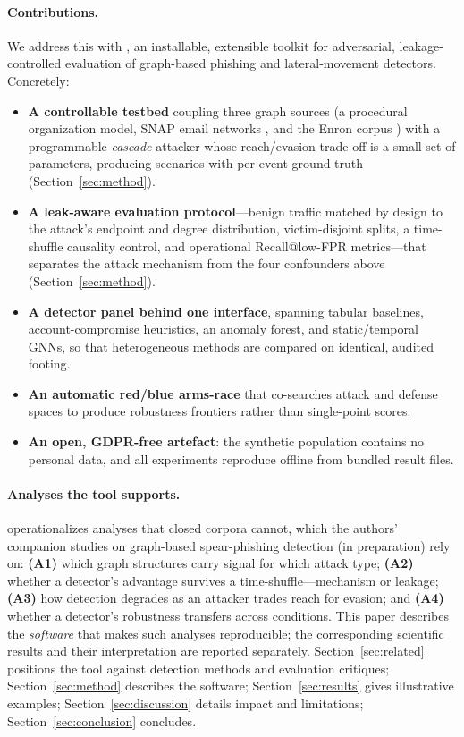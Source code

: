 \paragraph{Contributions.} We address this with \tool, an installable, extensible toolkit
for adversarial, leakage-controlled evaluation of graph-based phishing and lateral-movement
detectors. Concretely:

\begin{itemize}[leftmargin=1.4em,itemsep=2pt]
\item \textbf{A controllable testbed} coupling three graph sources (a procedural
  organization model, SNAP email networks \cite{leskovec2014snap}, and the Enron corpus
  \cite{klimt2004enron}) with a programmable \emph{cascade} attacker whose reach/evasion
  trade-off is a small set of parameters, producing scenarios with per-event ground truth
  (Section~\ref{sec:method}).
\item \textbf{A leak-aware evaluation protocol}---benign traffic matched by design to the
  attack's endpoint and degree distribution, victim-disjoint splits, a time-shuffle
  causality control, and operational Recall@low-FPR metrics---that separates the attack
  mechanism from the four confounders above (Section~\ref{sec:method}).
\item \textbf{A detector panel behind one interface}, spanning tabular baselines,
  account-compromise heuristics, an anomaly forest, and static/temporal GNNs, so that
  heterogeneous methods are compared on identical, audited footing.
\item \textbf{An automatic red/blue arms-race} that co-searches attack and defense spaces to
  produce robustness frontiers rather than single-point scores.
\item \textbf{An open, GDPR-free artefact}: the synthetic population contains no personal
  data, and all experiments reproduce offline from bundled result files.
\end{itemize}

\paragraph{Analyses the tool supports.} \tool operationalizes analyses that closed corpora
cannot, which the authors' companion studies on graph-based spear-phishing detection (in
preparation) rely on: \textbf{(A1)} which graph structures carry signal for which attack type;
\textbf{(A2)} whether a detector's advantage survives a time-shuffle---mechanism or leakage;
\textbf{(A3)} how detection degrades as an attacker trades reach for evasion; and
\textbf{(A4)} whether a detector's robustness transfers across conditions. This paper describes
the \emph{software} that makes such analyses reproducible; the corresponding scientific results
and their interpretation are reported separately. Section~\ref{sec:related} positions the tool
against detection methods and evaluation critiques; Section~\ref{sec:method} describes the
software; Section~\ref{sec:results} gives illustrative examples;
Section~\ref{sec:discussion} details impact and limitations;
Section~\ref{sec:conclusion} concludes.